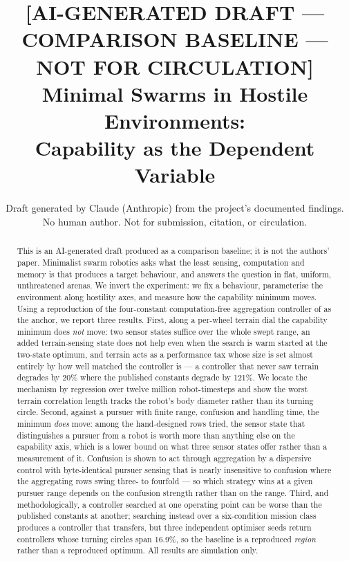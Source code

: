 \documentclass[11pt,a4paper]{article}
\title{\normalsize\textbf{[AI-GENERATED DRAFT — COMPARISON BASELINE — NOT FOR
CIRCULATION]}\\[1.2em]
\LARGE Minimal Swarms in Hostile Environments:\\
Capability as the Dependent Variable}
\author{\normalsize Draft generated by Claude (Anthropic) from the project's
documented findings.\\ \normalsize No human author. Not for submission,
citation, or circulation.}
\date{}
\begin{document}
\maketitle
\thispagestyle{fancy}

\begin{abstract}
\noindent This is an AI-generated draft produced as a comparison baseline; it is
not the authors' paper. Minimalist swarm robotics asks what the least sensing,
computation and memory is that produces a target behaviour, and answers the
question in flat, uniform, unthreatened arenas. We invert the experiment: we fix
a behaviour, parameterise the environment along hostility axes, and measure how
the capability minimum moves. Using a reproduction of the four-constant
computation-free aggregation controller of \citet{gauci2014} as the anchor, we
report three results. First, along a per-wheel terrain dial the capability
minimum does \emph{not} move: two sensor states suffice over the whole swept
range, an added terrain-sensing state does not help even when the search is warm
started at the two-state optimum, and terrain acts as a performance tax whose
size is set almost entirely by how well matched the controller is --- a
controller that never saw terrain degrades by 20\% where the published constants
degrade by 121\%. We locate the mechanism by regression over twelve million
robot-timesteps and show the worst terrain correlation length tracks the robot's
body diameter rather than its turning circle. Second, against a pursuer with
finite range, confusion and handling time, the minimum \emph{does} move: among
the hand-designed rows tried, the sensor state that distinguishes a pursuer from
a robot is worth more than anything else on the capability axis, which is a lower
bound on what three sensor states offer rather than a measurement of it.
Confusion is shown to act through aggregation by a dispersive control with
byte-identical pursuer sensing that is nearly insensitive to confusion where the
aggregating rows swing three- to fourfold --- so which strategy wins at a given
pursuer range depends on the confusion strength rather than on the range. Third, and
methodologically, a controller searched at one operating point can be worse than
the published constants at another; searching instead over a six-condition
mission class produces a controller that transfers, but three independent
optimiser seeds return controllers whose turning circles span 16.9\%, so the
baseline is a reproduced \emph{region} rather than a reproduced optimum. All
results are simulation only.
\end{abstract}
\end{document}
